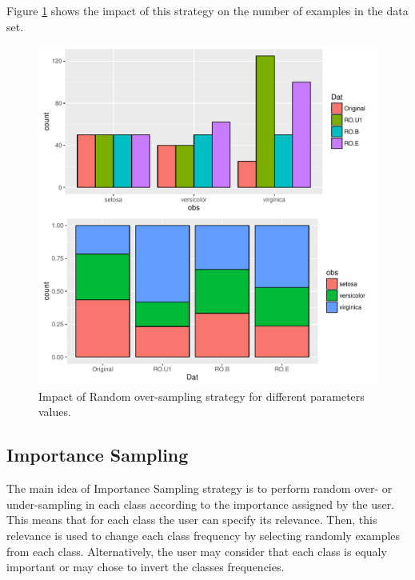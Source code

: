 \documentclass[10pt,a4paper]{article}\usepackage[]{graphicx}\usepackage[]{color}
\makeatletter
\def\maxwidth{ %
  \ifdim\Gin@nat@width>\linewidth
    \linewidth
  \else
    \Gin@nat@width
  \fi
}
\newenvironment{knitrout}{}{} %
\makeatother
\begin{document}
Figure \ref{fig:Iris_RO2} shows the impact of this strategy on the number of examples in the data set.

\begin{knitrout}\footnotesize
{}\color{fgcolor}\begin{figure}

{\centering \includegraphics[width=\maxwidth]{figures/UBL-Iris_RO2-1} 

}

\caption[Impact of Random over-sampling strategy for different parameters values]{Impact of Random over-sampling strategy for different parameters values.}\label{fig:Iris_RO2}
\end{figure}


\end{knitrout}

\subsection{Importance Sampling}\label{sec:ISClassif}

The main idea of Importance Sampling strategy is to perform random over- or under-sampling in each class according to the importance assigned by the user. This means that for each class the user can specify its relevance. Then, this relevance is used to change each class frequency by selecting randomly examples from each class. Alternatively, the user may consider that each class is equaly important or may chose to invert the classes frequencies.
\end{document}
